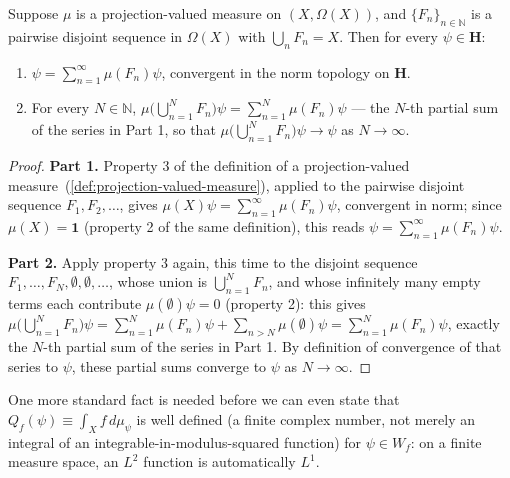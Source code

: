 \begin{lemma}
    \label{lmm:norm-convergent-decomposition}
    \leanok
    Suppose $\mu$ is a projection-valued measure on $(X,\Omega(X))$, and $\{F_n\}_{n\in\mathbb{N}}$ is a pairwise disjoint sequence in $\Omega(X)$ with $\bigcup_n F_n = X$. Then for every $\psi \in \mathbf{H}$:
    \begin{enumerate}
        \item $\psi = \sum_{n=1}^\infty \mu(F_n)\psi$, convergent in the norm topology on $\mathbf{H}$.
        \item For every $N \in \mathbb{N}$, $\mu\big( \bigcup_{n=1}^N F_n \big)\psi = \sum_{n=1}^N \mu(F_n)\psi$ — the $N$-th partial sum of the series in Part 1, so that $\mu\big( \bigcup_{n=1}^N F_n \big)\psi \to \psi$ as $N \to \infty$.
    \end{enumerate}
\end{lemma}
\begin{proof}
    \leanok
\textbf{Part 1.} Property 3 of the definition of a projection-valued measure~(\ref{def:projection-valued-measure}), applied to the pairwise disjoint sequence $F_1, F_2, \ldots$, gives $\mu(X)\psi = \sum_{n=1}^\infty \mu(F_n)\psi$, convergent in norm; since $\mu(X) = \mathbf{1}$ (property 2 of the same definition), this reads $\psi = \sum_{n=1}^\infty \mu(F_n)\psi$.

\textbf{Part 2.} Apply property 3 again, this time to the disjoint sequence $F_1, \ldots, F_N, \emptyset, \emptyset, \ldots$, whose union is $\bigcup_{n=1}^N F_n$, and whose infinitely many empty terms each contribute $\mu(\emptyset)\psi = 0$ (property 2): this gives $\mu\big( \bigcup_{n=1}^N F_n \big)\psi = \sum_{n=1}^N \mu(F_n)\psi + \sum_{n>N} \mu(\emptyset)\psi = \sum_{n=1}^N \mu(F_n)\psi$, exactly the $N$-th partial sum of the series in Part 1. By definition of convergence of that series to $\psi$, these partial sums converge to $\psi$ as $N \to \infty$.
\end{proof}

One more standard fact is needed before we can even state that $Q_f(\psi) \equiv \int_X f \, d\mu_\psi$ is well defined (a finite complex number, not merely an integral of an integrable-in-modulus-squared function) for $\psi \in W_f$: on a finite measure space, an $L^2$ function is automatically $L^1$.

